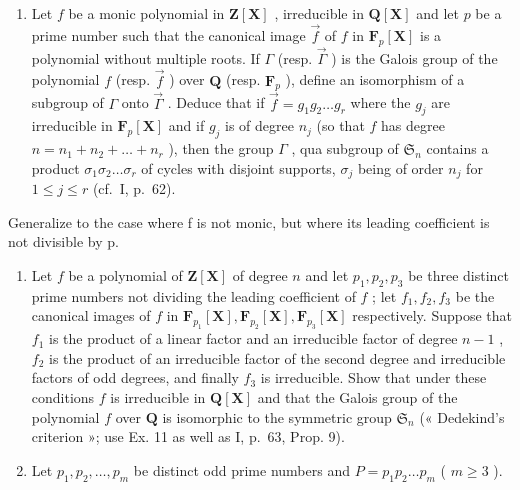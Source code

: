 \begin{enumerate}
\def\labelenumi{\arabic{enumi})}
\setcounter{enumi}{10}
\tightlist
\item
  Let \(f\) be a monic polynomial in \(\mathbf{Z}[\mathbf{X}]\) , irreducible in \(\mathbf{Q}[\mathbf{X}]\) and let \(p\) be a prime number such that the canonical image \(\vec{f}\) of \(f\) in \(\mathbf{F}_p[\mathbf{X}]\) is a polynomial without multiple roots. If \(\Gamma\) (resp. \(\vec{\Gamma}\) ) is the Galois group of the polynomial \(f\) (resp. \(\vec{f}\) ) over \(\mathbf{Q}\) (resp. \(\mathbf{F}_p\) ), define an isomorphism of a subgroup of \(\Gamma\) onto \(\vec{\Gamma}\) . Deduce that if \(\vec{f} = g_1g_2\ldots g_r\) where the \(g_j\) are irreducible in \(\mathbf{F}_p[\mathbf{X}]\) and if \(g_j\) is of degree \(n_j\) (so that \(f\) has degree \(n = n_1 + n_2 + \dots + n_r\) ), then the group \(\Gamma\) , qua subgroup of \(\mathfrak{S}_n\) contains a product \(\sigma_1\sigma_2\ldots\sigma_r\) of cycles with disjoint supports, \(\sigma_j\) being of order \(n_j\) for \(1\leqslant j\leqslant r\) (cf.~I, p.~62).
\end{enumerate}

Generalize to the case where f is not monic, but where its leading coefficient is not divisible by p.

\begin{enumerate}
\def\labelenumi{\arabic{enumi})}
\setcounter{enumi}{11}
\item
  Let \(f\) be a polynomial of \(\mathbf{Z}[\mathbf{X}]\) of degree \(n\) and let \(p_1, p_2, p_3\) be three distinct prime numbers not dividing the leading coefficient of \(f\) ; let \(f_1, f_2, f_3\) be the canonical images of \(f\) in \(\mathbf{F}_{p_1}[\mathbf{X}], \mathbf{F}_{p_2}[\mathbf{X}], \mathbf{F}_{p_3}[\mathbf{X}]\) respectively. Suppose that \(f_1\) is the product of a linear factor and an irreducible factor of degree \(n - 1\) , \(f_2\) is the product of an irreducible factor of the second degree and irreducible factors of odd degrees, and finally \(f_3\) is irreducible. Show that under these conditions \(f\) is irreducible in \(\mathbf{Q}[\mathbf{X}]\) and that the Galois group of the polynomial \(f\) over \(\mathbf{Q}\) is isomorphic to the symmetric group \(\mathfrak{S}_n\) (« Dedekind's criterion »; use Ex. 11 as well as I, p.~63, Prop. 9).
\item
  Let \(p_1, p_2, \ldots, p_m\) be distinct odd prime numbers and \(P = p_1p_2 \ldots p_m\) ( \(m \geqslant 3\) ).
\end{enumerate}

